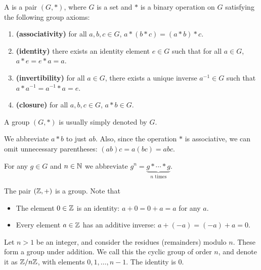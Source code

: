 \begin{definition}
A  is a pair $(G,\ast)$, where $G$ is a set and $\ast$ is a binary operation on $G$ satisfying the following group axioms:
\begin{enumerate}
\item \textbf{(associativity)} for all $a,b,c \in G$, $a \ast (b \ast c)=(a \ast b) \ast c$.
\item \textbf{(identity)} there exists an identity element $e \in G$ such that for all $a\in G$, $a \ast e = e \ast a = a$.
\item \textbf{(invertibility)} for all $a \in G$, there exists a unique inverse $a^{-1} \in G$ such that $a \ast a^{-1} = a^{-1} \ast a = e$.
\item \textbf{(closure)} for all $a,b,c \in G$, $a\ast b\in G$.
\end{enumerate}
\end{definition}

\begin{notation}
A group $(G,\ast)$ is usually simply denoted by $G$.
\end{notation}

\begin{notation}
We abbreviate $a \ast b$ to just $ab$. Also, since the operation $\ast$ is associative, we can omit unnecessary parentheses: $(ab)c = a(bc) = abc$.
\end{notation}

\begin{notation}
For any $g \in G$ and $n \in \mathbb N$ we abbreviate $g^n = \underbrace{g \ast \cdots \ast g}_{n\text{ times}}$.
\end{notation}

\begin{example}
The pair $(\mathbb Z,+)$ is a group. Note that
\begin{itemize}
\item The element $0 \in \mathbb Z$ is an identity: $a+0=0+a=a$ for any $a$.
\item Every element $a \in \mathbb Z$ has an additive inverse: $a+(-a)=(-a)+a=0$.
\end{itemize}
\end{example}

\begin{example}
Let $n > 1$ be an integer, and consider the residues (remainders) modulo $n$. These form a group under addition. We call this the cyclic group of order $n$, and denote it as $\mathbb Z/n\mathbb Z$, with elements $0, 1, \dots, n-1$. The identity is 0.
\end{example}

